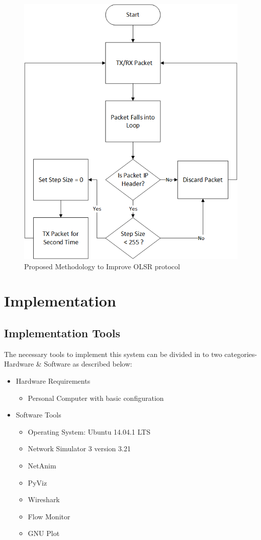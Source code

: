 \documentclass[12pt,a4paper]{report}
\begin{document}
\begin{figure}[hbtp]
\centering
\includegraphics[scale=.6]{Final-Methodology.png}
\caption{Proposed Methodology to Improve OLSR protocol}
\end{figure}


\chapter{Implementation}

\section{Implementation Tools}
The necessary tools to implement this system can be divided in to two categories-Hardware \& Software as described below:
\begin{itemize}
\item 
Hardware Requirements
\begin{itemize}
\item 
Personal Computer with basic configuration
\end{itemize}
\item 
Software Tools
\begin{itemize}
\item 
Operating System: Ubuntu 14.04.1 LTS
\item 
Network Simulator 3 version 3.21
\item 
NetAnim
\item 
PyViz
\item 
Wireshark
\item 
Flow Monitor
\item 
GNU Plot
\end{itemize}
\end{itemize}
\end{document}
